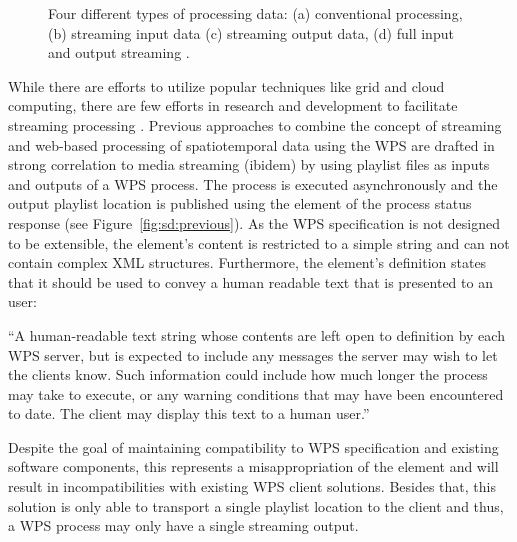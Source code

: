 	\begin{figure}[!htb]
		\centering
		
		\caption{\label{fig:streaming}Four different types of processing data: (a) conventional processing, (b) streaming input data (c) streaming output data, (d) full input and output streaming \citep[based on][]{foerster2012live}.}
	\end{figure}

	While there are efforts to utilize popular techniques like grid and cloud computing, there are few efforts in research and development to facilitate streaming processing \citep{foerster2012live}. Previous approaches to combine the concept of streaming and web-based processing of spatiotemporal data using the \ac{WPS} are drafted in strong correlation to media streaming (ibidem) by using playlist files \citep{ietf:draft-pantos-http-live-streaming-12} as inputs and outputs of a \ac{WPS} process. The process is executed asynchronously and the output playlist location is published using the  element of the process status response (see Figure~\ref{fig:sd:previous}). As the \ac{WPS} specification is not designed to be extensible, the element's content is restricted to a simple string and can not contain complex \ac{XML} structures. Furthermore, the element's definition states that it should be used to convey a human readable text that is presented to an user:
	\begin{xquote}
		``A human-readable text string whose contents are left open to definition by each WPS server, but is expected to include any messages the server may wish to let the clients know. Such information could include how much longer the process may take to execute, or any warning conditions that may have been encountered to date. The client may display this text to a human user.''
	\end{xquote}
	Despite the goal of maintaining compatibility to \ac{WPS} specification and existing software components, this represents a misappropriation of the element and will result in incompatibilities with existing \ac{WPS} client solutions. Besides that, this solution is only able to transport a single playlist location to the client and thus, a \ac{WPS} process may only have a single streaming output.

